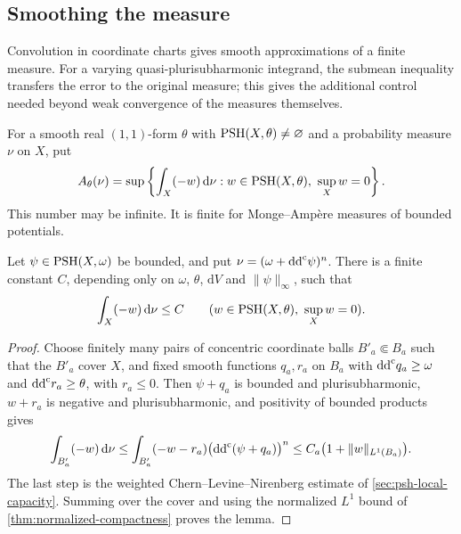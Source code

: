 \subsection{Smoothing the measure}
\label{subsec:psh-measure-smoothing}

Convolution in coordinate charts gives smooth approximations of a finite measure. For a varying quasi-plurisubharmonic integrand, the submean inequality transfers the error to the original measure; this gives the additional control needed beyond weak convergence of the measures themselves.

For a smooth real $(1,1)$-form $\theta$ with $\mathrm{PSH}(X,\theta)\ne\varnothing$ and a probability measure $\nu$ on $X$, put
\[
 A_\theta(\nu)=\sup\left\{\int_X(-w)\,\mathrm{d}\nu:
 w\in\mathrm{PSH}(X,\theta),\ \sup_Xw=0\right\}.
\]
This number may be infinite. It is finite for Monge--Amp\`ere measures of bounded potentials.

\begin{lemma}\label{lem:bounded-carrier-integrability}
Let $\psi\in\mathrm{PSH}(X,\omega)$ be bounded, and put $\nu=(\omega+\mathrm{dd}^{\mathrm{c}}\psi)^n$. There is a finite constant $C$, depending only on $\omega$, $\theta$, $\mathrm{d}V$ and $\|\psi\|_\infty$, such that
\[
 \int_X(-w)\,\mathrm{d}\nu\leq C
 \qquad(w\in\mathrm{PSH}(X,\theta),\ \sup_Xw=0).
\]
\end{lemma}
\begin{proof}
Choose finitely many pairs of concentric coordinate balls $B'_a\Subset B_a$ such that the $B'_a$ cover $X$, and fixed smooth functions $q_a,r_a$ on $B_a$ with $\mathrm{dd}^{\mathrm{c}} q_a\geq\omega$ and $\mathrm{dd}^{\mathrm{c}} r_a\geq\theta$, with $r_a\leq0$. Then $\psi+q_a$ is bounded and plurisubharmonic, $w+r_a$ is negative and plurisubharmonic, and positivity of bounded products gives
\[
 \int_{B'_a}(-w)\,\mathrm{d}\nu
 \leq\int_{B'_a}(-w-r_a)\bigl(\mathrm{dd}^{\mathrm{c}}(\psi+q_a)\bigr)^n
 \leq C_a\bigl(1+\|w\|_{L^1(B_a)}\bigr).
\]
The last step is the weighted Chern--Levine--Nirenberg estimate of \cref{sec:psh-local-capacity}. Summing over the cover and using the normalized $L^1$ bound of \cref{thm:normalized-compactness} proves the lemma.
\end{proof}

